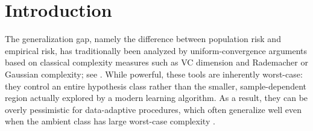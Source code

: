 \documentclass[11pt]{article}
\providecommand{\gen}{\operatorname{gen}}
\renewcommand{\paragraph}[1]{\noindent\textit{#1}}
\begin{document}

\date{\today}

\maketitle








\tableofcontents




\section{Introduction}\label{intro}





The generalization gap, namely the difference between population risk and
empirical risk, has traditionally been analyzed by uniform-convergence
arguments based on classical complexity measures such as VC dimension and
Rademacher or Gaussian complexity; see
\cite{koltchinskii2011oracle, Wainwright19, shalev2014understanding}.
While powerful, these tools are inherently worst-case: they control an entire
hypothesis class rather than the smaller, sample-dependent region actually
explored by a modern learning algorithm. As a result, they can be overly
pessimistic for data-adaptive procedures, which often generalize well even when
the ambient class has large worst-case complexity \citep{zhou2021optimistic}.
\end{document}
